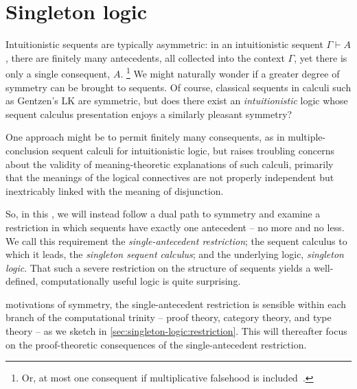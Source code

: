 \chapter{Singleton logic}\label{ch:singleton-logic}

Intuitionistic sequents are typically asymmetric:
in an intuitionistic sequent $\Gamma \vdash A$, there are finitely many antecedents, all collected into the context $\Gamma$, yet there is only a single consequent, $A$.%
\footnote{Or, at most one consequent if multiplicative falsehood is included~.}
We might naturally wonder if a greater degree of symmetry can be brought to sequents.
Of course, classical sequents in calculi such as Gentzen's LK\autocite{Gentzen:MZ35} are symmetric, but does there exist an \emph{intuitionistic} logic whose sequent calculus presentation enjoys a similarly pleasant symmetry?

One approach might be to permit finitely many consequents, as in multiple-conclusion sequent calculi for intuitionistic logic\autocites{Maehara:NMJ54}{Kleene:NH52}, but \citeauthor{Steinberger:JPL11}\autocite{Steinberger:JPL11} raises troubling concerns about the validity of meaning-theoretic explanations of such calculi, primarily that the meanings of the logical connectives are not properly independent but inextricably linked with the meaning of disjunction.

So, in this , we will instead follow a dual path to symmetry and examine a restriction in which sequents have exactly one antecedent -- no more and no less.
We call this requirement the \emph{single-antecedent restriction}; the sequent calculus to which it leads, the \emph{singleton sequent calculus}; and the underlying logic, \emph{singleton logic}.
That such a severe restriction on the structure of sequents yields a well-defined, computationally useful logic is quite surprising.

 motivations of symmetry, the single-antecedent restriction is sensible within each branch of the computational trinity\autocite{Harper:ET11} -- proof theory, category theory, and type theory -- as we sketch in \cref{sec:singleton-logic:restriction}.
This  will thereafter focus on the proof-theoretic consequences of the single-antecedent restriction.

